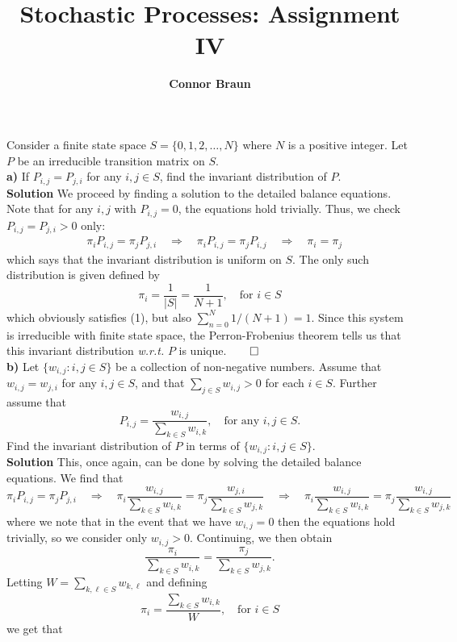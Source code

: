 \documentclass[11pt, letterpaper]{article}
\title{\bf Stochastic Processes: Assignment IV}
\author{\bf Connor Braun}
\date{}
\begin{document}
    
    \maketitle
     Consider a finite state space $S=\{0,1,2,\dots, N\}$ where $N$ is a positive integer. Let $P$ be an irreducible transition matrix on $S$.\\[10pt]
    {\bf a)} If $P_{i,j}=P_{j,i}$ for any $i,j\in S$, find the invariant distribution of $P$.\\[10pt]
    {\bf Solution} We proceed by finding a solution to the detailed balance equations. Note that for any $i,j$ with $P_{i,j}=0$, the equations hold trivially. Thus, we check $P_{i,j}=P_{j,i}>0$ only:
    \begin{align*}
        &\pi_iP_{i,j}=\pi_j P_{j,i}\quad\Rightarrow\quad \pi_iP_{i,j}=\pi_j P_{i,j}\quad\Rightarrow\quad \pi_i=\pi_j\tag{1}
    \end{align*}
    which says that the invariant distribution is uniform on $S$. The only such distribution is given defined by
    \[\pi_i=\frac{1}{|S|}=\frac{1}{N+1},\quad\text{for $i\in S$}\]
    which obviously satisfies (1), but also $\sum_{n=0}^{N}1/(N+1)=1$. Since this system is irreducible with finite state space, the Perron-Fr\:obenius theorem tells us that this invariant distribution {\it w.r.t.} $P$ is unique.\hfill{$\qed$}\\[10pt]
    {\bf b)} Let $\{w_{i,j}:i,j\in S\}$ be a collection of non-negative numbers. Assume that $w_{i,j}=w_{j,i}$ for any $i,j\in S$, and that $\sum_{j\in S}w_{i,j}>0$ for each $i\in S$. Further assume that
    \[P_{i,j}=\frac{w_{i,j}}{\sum_{k\in S}w_{i,k}},\quad\text{for any $i,j\in S$.}\]
    Find the invariant distribution of $P$ in terms of $\{w_{i,j}:i,j\in S\}$.\\[10pt]
    {\bf Solution} This, once again, can be done by solving the detailed balance equations. We find that
    \[\pi_i P_{i,j}=\pi_j P_{j,i}\quad\Rightarrow\quad \pi_{i}\frac{w_{i,j}}{\sum_{k\in S}w_{i,k}}=\pi_j\frac{w_{j,i}}{\sum_{k\in S}w_{j,k}}\quad\Rightarrow\quad\pi_{i}\frac{w_{i,j}}{\sum_{k\in S}w_{i,k}}=\pi_j\frac{w_{i,j}}{\sum_{k\in S}w_{j,k}}\]
    where we note that in the event that we have $w_{i,j}=0$ then the equations hold trivially, so we consider only $w_{i,j}>0$. Continuing, we then obtain
    \[\frac{\pi_i}{\sum_{k\in S}w_{i,k}}=\frac{\pi_j}{\sum_{k\in S}w_{j,k}}.\tag{2}\]
    Letting $W=\sum_{k,\ell\in S}w_{k,\ell}$ and defining 
    \[\pi_i=\frac{\sum_{k\in S}w_{i,k}}{W},\quad\text{for $i\in S$}\tag{3}\]
    we get that
\end{document}

